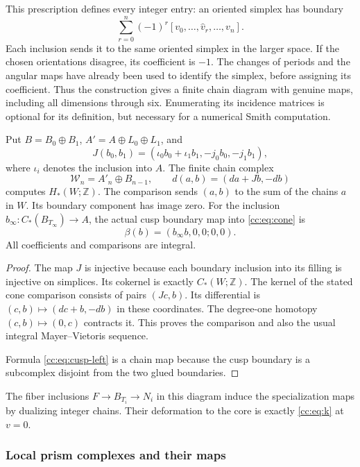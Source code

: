 This prescription defines every integer entry: an oriented simplex has
boundary
\[\sum_{r=0}^n(-1)^r[v_0,\ldots,\widehat v_r,\ldots,v_n].\]
Each inclusion sends it to the same oriented simplex in the larger space.
If the chosen orientations disagree, its coefficient is $-1$.
The changes of periods and the angular maps have already been used to
identify the simplex, before assigning its coefficient.
Thus the construction gives a finite chain diagram with genuine maps,
including all dimensions through six. Enumerating its incidence matrices
is optional for its definition, but necessary for a numerical Smith computation.

\begin{theorem}\label{cc:thm:cone}
Put $B=B_0\oplus B_1$, $A'=A\oplus L_0\oplus L_1$, and
\[
J(b_0,b_1)=(\iota_0b_0+\iota_1b_1,-j_0b_0,-j_1b_1),
\]
where $\iota_i$ denotes the inclusion into $A$.
The finite chain complex
\begin{equation}\label{cc:eq:cone}
\mathcal W_n=A'_n\oplus B_{n-1},\qquad
d(a,b)=(d a+Jb,-d b)
\end{equation}
computes $H_*(W;\mathbb Z)$.
The comparison sends $(a,b)$ to the sum of the chains $a$ in $W$.
Its boundary component has image zero.
For the inclusion $b_\infty:C_*(B_{T_\infty})\to A$,
the actual cusp boundary map into \eqref{cc:eq:cone} is
\begin{equation}\label{cc:eq:cusp-left}
\beta(b)=(b_\infty b,0,0;0,0).
\end{equation}
All coefficients and comparisons are integral.
\end{theorem}

\begin{proof}
The map $J$ is injective because each boundary inclusion into its filling
is injective on simplices. Its cokernel is exactly $C_*(W;\mathbb Z)$.
The kernel of the stated cone comparison consists of pairs $(Jc,b)$.
Its differential is $(c,b)\mapsto(dc+b,-db)$ in these coordinates.
The degree-one homotopy $(c,b)\mapsto(0,c)$ contracts it.
This proves the comparison and also the usual integral Mayer--Vietoris
sequence.

Formula \eqref{cc:eq:cusp-left} is a chain map because the
cusp boundary is a subcomplex disjoint from the two glued boundaries.
\end{proof}

The fiber inclusions $F\to B_{T_i}\to N_i$ in this diagram induce the
specialization maps by dualizing integer chains.
Their deformation to the core is exactly \eqref{cc:eq:k} at $v=0$.
\subsubsection{Local prism complexes and their maps}

